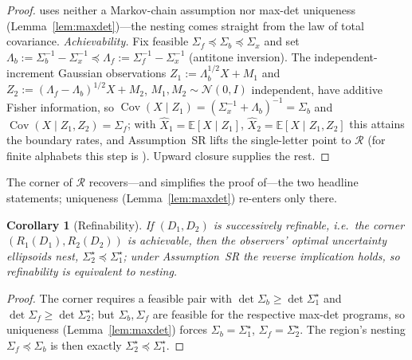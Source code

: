 \documentclass[11pt]{article}
\newtheorem{corollary}{Corollary}
\theoremstyle{definition}
\theoremstyle{remark}
\newcommand{\E}{\mathbb{E}}
\newcommand{\Cov}{\operatorname{Cov}}
\begin{document}
\begin{proof}
{uses neither a Markov-chain assumption nor max-det uniqueness
(Lemma~\ref{lem:maxdet})---the nesting comes straight from the law of total covariance.} \emph{Achievability.} Fix feasible $\Sigma_f\preceq\Sigma_b
\preceq\Sigma_x$ and set $\Lambda_b:=\Sigma_b^{-1}-\Sigma_x^{-1}\preceq\Lambda_f:=
\Sigma_f^{-1}-\Sigma_x^{-1}$ (antitone inversion). The independent-increment Gaussian
observations $Z_1:=\Lambda_b^{1/2}X+M_1$ and $Z_2:=(\Lambda_f-\Lambda_b)^{1/2}X+M_2$,
$M_1,M_2\sim\mathcal N(0,I)$ independent, have additive Fisher information, so
$\Cov(X\mid Z_1)=(\Sigma_x^{-1}+\Lambda_b)^{-1}=\Sigma_b$ and $\Cov(X\mid Z_1,Z_2)=
\Sigma_f$; with $\hat X_1=\E[X\mid Z_1]$, $\hat X_2=\E[X\mid Z_1,Z_2]$ this attains the
boundary rates, and Assumption~SR lifts the single-letter point to $\mathcal R$ (for
finite alphabets this step is \cite{rimoldi}). Upward closure
supplies the rest.
\end{proof}

The corner of $\mathcal R$ recovers---and simplifies the proof of---the two headline
statements; uniqueness (Lemma~\ref{lem:maxdet}) re-enters only there.

\begin{corollary}[Refinability]\label{thm:multiobs}
If $(D_1,D_2)$ is successively refinable, i.e.\ the corner $(R_1(D_1),R_2(D_2))$ is
achievable, then the observers' optimal uncertainty ellipsoids nest,
$\Sigma_2^\star\preceq\Sigma_1^\star$; under Assumption~SR the reverse implication
holds, so refinability is equivalent to nesting.
\end{corollary}
\begin{proof}
The corner requires a feasible pair with $\det\Sigma_b\ge\det\Sigma_1^\star$ and
$\det\Sigma_f\ge\det\Sigma_2^\star$; but $\Sigma_b,\Sigma_f$ are feasible for the
respective max-det programs, so uniqueness (Lemma~\ref{lem:maxdet}) forces
$\Sigma_b=\Sigma_1^\star$, $\Sigma_f=\Sigma_2^\star$. The region's nesting
$\Sigma_f\preceq\Sigma_b$ is then exactly $\Sigma_2^\star\preceq\Sigma_1^\star$.
\end{proof}
\end{document}
